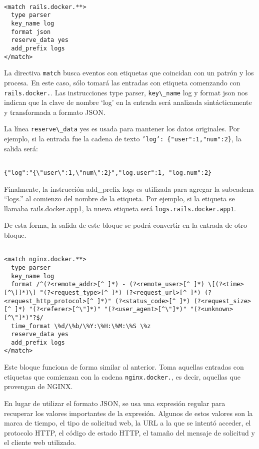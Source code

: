 \begin{lstlisting}

<match rails.docker.**>
  type parser
  key_name log
  format json
  reserve_data yes
  add_prefix logs
</match>

\end{lstlisting}

La directiva \lstinline{match} busca eventos con etiquetas que coincidan con un
patrón y los procesa. En este caso, sólo tomará las entradas con etiqueta
comenzando con \lstinline{rails.docker.}. Las instrucciones type parser,
\lstinline{key\_name} log y format json nos indican que la clave de nombre
‘log’ en la entrada será analizada sintácticamente y transformada a formato
JSON.

La línea \lstinline{reserve\_data} yes es usada para mantener los datos
originales. Por ejemplo, si la entrada fue la cadena de texto
\texttt{'log': \{"user":1,"num":2\}}, la salida será:

\begin{lstlisting}

{"log":"{\"user\":1,\"num\":2}","log.user":1, "log.num":2}

\end{lstlisting}

Finalmente, la instrucción add\_prefix logs es utilizada para agregar la
subcadena “logs.” al comienzo del nombre de la etiqueta. Por ejemplo, si la
etiqueta se llamaba rails.docker.app1, la nueva etiqueta será
\lstinline{logs.rails.docker.app1}.

De esta forma, la salida de este bloque se podrá convertir en la entrada de
otro bloque.

\begin{lstlisting}

<match nginx.docker.**>
  type parser
  key_name log
  format /^(?<remote_addr>[^ ]*) - (?<remote_user>[^ ]*) \[(?<time>[^\]]*)\] "(?<request_type>[^ ]*) (?<request_url>[^ ]*) (?<request_http_protocol>[^ ]*)" (?<status_code>[^ ]*) (?<request_size>[^ ]*) "(?<referer>[^\"]*)" "(?<user_agent>[^\"]*)" "(?<unknown>[^\"]*)"?$/
  time_format \%d/\%b/\%Y:\%H:\%M:\%S \%z
  reserve_data yes
  add_prefix logs
</match>

\end{lstlisting}

Este bloque funciona de forma similar al anterior. Toma aquellas entradas con
etiquetas que comienzan con la cadena \lstinline{nginx.docker.}, es decir, aquellas que
provengan de NGINX.

En lugar de utilizar el formato JSON, se usa una expresión regular para
recuperar los valores importantes de la expresión. Algunos de estos valores son
la marca de tiempo, el tipo de solicitud web, la URL a la que se intentó
acceder, el protocolo HTTP, el código de estado HTTP, el tamaño del mensaje de
solicitud y el cliente web utilizado.

